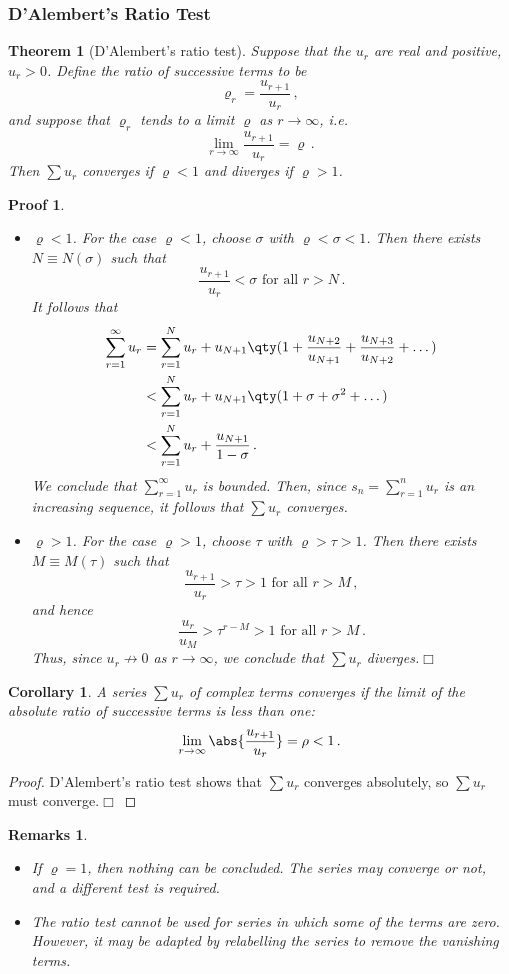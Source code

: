 \documentclass{article}
\theoremstyle{plain}\theoremheaderfont{\normalfont\itshape}\theorembodyfont{\rmfamily}\theoremseparator{.}\newtheorem*{rem}{Remark}\newtheorem*{ex}{Example}\newtheorem*{proof}{Proof}\newtheorem*{altp}{Alternative proof}
\theoremstyle{plain}\theoremheaderfont{\normalfont\bfseries}\theorembodyfont{\rmfamily}\theoremseparator{.}\newtheorem{thm}{Theorem}[section]\newtheorem{lem}[thm]{Lemma}\newtheorem{prop}[thm]{Proposition}\newtheorem*{cor}{Corollary}\newtheorem{defn}[thm]{Definition}\newtheorem{clm}[thm]{Claim}\newtheorem{clminproof}{Claim}
\theoremstyle{break}\theoremheaderfont{\normalfont\itshape}\theorembodyfont{\rmfamily}\theoremseparator{.\medskip}\newtheorem*{proofskip}{Proof}\newtheorem*{exs}{Examples}\newtheorem*{rems}{Remarks}
\theoremstyle{break}\theoremheaderfont{\normalfont\bfseries}\theorembodyfont{\rmfamily}\theoremseparator{.\medskip}\newtheorem{lemskip}[thm]{Lemma}\newtheorem{defnskip}[thm]{Definition}\newtheorem{propskip}[thm]{Proposition}\newtheorem{thmskip}[thm]{Theorem}
\numberwithin{equation}{section}
\newcommand{\qed}{\hfill\ensuremath{\Box}}
\begin{document}
	\subsubsection{D'Alembert's Ratio Test}
	\begin{thm}[D'Alembert's ratio test]		
		Suppose that the \(u_r\) are real and positive, \(u_r>0\). Define the ratio of successive terms to be
		\[\varrho_r=\frac{u_{r+1}}{u_r}\,,\]
		and suppose that \(\varrho_r\) tends to a limit \(\varrho\) as \(r\to\infty\), i.e.
		\[\lim_{r\to\infty}\frac{u_{r+1}}{u_r}=\varrho\,.\]
		Then \(\sum u_r\) converges if \(\varrho<1\) and diverges if \(\varrho>1\).
	\end{thm}
	\begin{proofskip}
		\begin{itemize}[topsep=0pt]
			\item \(\varrho<1\). For the case \(\varrho<1\), choose \(\sigma\) with \(\varrho<\sigma<1\). Then there exists \(N\equiv N(\sigma)\) such that
			\[\frac{u_{r+1}}{u_r}<\sigma\text{ for all }r>N\,.\]
			It follows that
			\begin{align*}
				\sum_{r=1}^{\infty}u_r&=\sum_{r=1}^{N}u_r+u_{N+1}\qty(1+\frac{u_{N+2}}{u_{N+1}}+\frac{u_{N+3}}{u_{N+2}}+\dots)\\
				&<\sum_{r=1}^{N}u_r+u_{N+1}\qty(1+\sigma+\sigma^2+\dots)\\
				&<\sum_{r=1}^{N}u_r+\frac{u_{N+1}}{1-\sigma}\,.
			\end{align*}
			We conclude that \(\sum_{r=1}^{\infty}u_r\) is bounded. Then, since \(s_n=\sum_{r=1}^{n}u_r\) is an increasing sequence, it follows that \(\sum u_r\) converges.
			\item \(\varrho>1\). For the case \(\varrho>1\), choose \(\tau\) with \(\varrho>\tau>1\). Then there exists \(M\equiv M(\tau)\) such that
			\[\frac{u_{r+1}}{u_r}>\tau>1\text{ for all }r>M\,,\]
			and hence
			\[\frac{u_r}{u_M}>\tau^{r-M}>1\text{ for all }r>M\,.\]
			Thus, since \(u_r\not\to 0\) as \(r\to\infty\), we conclude that \(\sum u_r\) diverges.\qed
		\end{itemize}
	\end{proofskip}
	\begin{cor}
		A series \(\sum u_r\) of complex terms converges if the limit of the absolute ratio of successive terms is less than one:
		\[\lim_{r\to\infty}\abs{\frac{u_{r+1}}{u_r}}=\rho<1\,.\]
	\end{cor}
	\begin{proof}
		D'Alembert's ratio test shows that \(\sum u_r\) converges absolutely, so \(\sum u_r\) must converge.\qed
	\end{proof}
	\begin{rems}
		\begin{itemize}[topsep=0pt]
			\item If \(\varrho=1\), then nothing can be concluded. The series may converge or not, and a different test is required.
			\item The ratio test cannot be used for series in which some of the terms are zero. However, it may be adapted by relabelling the series to remove the vanishing terms.
		\end{itemize}
	\end{rems}
	
\end{document}

